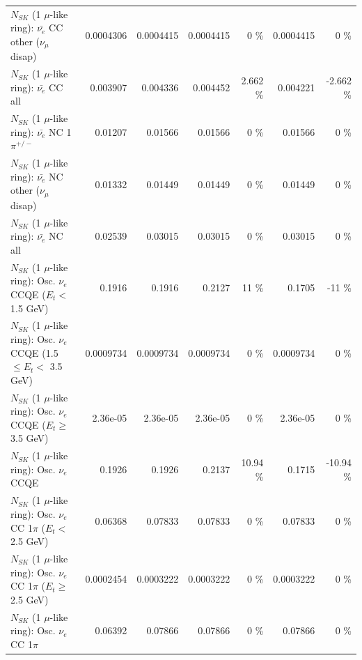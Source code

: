 \begin{table}
\begin{tabular}{| l | r | r | r  r | r  r |}
          $N_{SK}$ (1 $\mu$-like ring): $\bar{\nu_e}$ CC other ($\nu_\mu$ disap) &       0.0004306 &       0.0004415 &       0.0004415 &        0 \%  &       0.0004415 &        0 \%  \\ 
                            $N_{SK}$ (1 $\mu$-like ring): $\bar{\nu_{e}}$ CC all &        0.003907 &        0.004336 &        0.004452 &    2.662 \%  &        0.004221 &   -2.662 \%  \\ 
\hline
                     $N_{SK}$ (1 $\mu$-like ring): $\bar{\nu_e}$ NC 1$\pi^{+/-}$ &         0.01207 &         0.01566 &         0.01566 &        0 \%  &         0.01566 &        0 \%  \\ 
          $N_{SK}$ (1 $\mu$-like ring): $\bar{\nu_e}$ NC other ($\nu_\mu$ disap) &         0.01332 &         0.01449 &         0.01449 &        0 \%  &         0.01449 &        0 \%  \\ 
                            $N_{SK}$ (1 $\mu$-like ring): $\bar{\nu_{e}}$ NC all &         0.02539 &         0.03015 &         0.03015 &        0 \%  &         0.03015 &        0 \%  \\ 
\hline
\hline
\hline
             $N_{SK}$ (1 $\mu$-like ring): Osc. $\nu_e$ CCQE ($E_{t} <$ 1.5 GeV) &          0.1916 &          0.1916 &          0.2127 &       11 \%  &          0.1705 &      -11 \%  \\ 
    $N_{SK}$ (1 $\mu$-like ring): Osc. $\nu_e$ CCQE (1.5 $\leq E_{t} <$ 3.5 GeV) &       0.0009734 &       0.0009734 &       0.0009734 &        0 \%  &       0.0009734 &        0 \%  \\ 
          $N_{SK}$ (1 $\mu$-like ring): Osc. $\nu_e$ CCQE ($E_{t} \geq$ 3.5 GeV) &        2.36e-05 &        2.36e-05 &        2.36e-05 &        0 \%  &        2.36e-05 &        0 \%  \\ 
\hline
                                 $N_{SK}$ (1 $\mu$-like ring): Osc. $\nu_e$ CCQE &          0.1926 &          0.1926 &          0.2137 &    10.94 \%  &          0.1715 &   -10.94 \%  \\ 
\hline
        $N_{SK}$ (1 $\mu$-like ring): Osc. $\nu_e$ CC 1$\pi$ ($E_{t} <$ 2.5 GeV) &         0.06368 &         0.07833 &         0.07833 &        0 \%  &         0.07833 &        0 \%  \\ 
     $N_{SK}$ (1 $\mu$-like ring): Osc. $\nu_e$ CC 1$\pi$ ($E_{t} \geq$ 2.5 GeV) &       0.0002454 &       0.0003222 &       0.0003222 &        0 \%  &       0.0003222 &        0 \%  \\ 
\hline
                            $N_{SK}$ (1 $\mu$-like ring): Osc. $\nu_e$ CC 1$\pi$ &         0.06392 &         0.07866 &         0.07866 &        0 \%  &         0.07866 &        0 \%  \\ 

\end{tabular}
\end{table}
